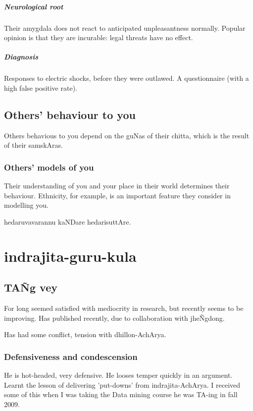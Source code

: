 \documentclass[oneside, article]{memoir}
\begin{document}
\subsubsection{Neurological root}
Their amygdala does not react to anticipated unpleasantness normally. Popular opinion is  that they are incurable: legal threats have no effect.

\subsubsection{Diagnosis}
Responses to electric shocks, before they were outlawed. A questionnaire (with a high false positive rate).

\chapter{Others' behaviour to you}
Others behavious to you depend on the guNas of their chitta, which is the result of their samskAras.

\section{Others' models of you}
Their understanding of you and your place in their world determines their behaviour. Ethnicity, for example, is an important feature they consider in modelling you.

hedaruvavarannu kaNDare hedarisuttAre.

\part{indrajita-guru-kula}
\chapter{TA\~Ng vey}
For long seemed satisfied with mediocrity in research, but recently seems to be improving. Has published recently, due to collaboration with jhe\~Ngdong.

Has had some conflict, tension with dhillon-AchArya.

\section{Defensiveness and condescension}
He is hot-headed, very defensive. He looses temper quickly in an argument. Learnt the lesson of delivering 'put-downs' from indrajita-AchArya. I received some of this when I was taking the Data mining course he was TA-ing in fall 2009.
\end{document}
